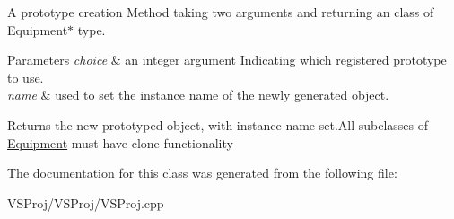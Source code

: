 A prototype creation Method taking two arguments and returning an class of Equipment$\ast$ type. 


\begin{DoxyParams}{Parameters}
{\em choice} & an integer argument Indicating which registered prototype to use. \\
\hline
{\em name} & used to set the instance name of the newly generated object. \\
\hline
\end{DoxyParams}
\begin{DoxyReturn}{Returns}
the new prototyped object, with instance name set.\+All subclasses of \hyperlink{class_equipment}{Equipment} must have clone functionality 
\end{DoxyReturn}


The documentation for this class was generated from the following file\+:\begin{DoxyCompactItemize}
\item 
V\+S\+Proj/\+V\+S\+Proj/V\+S\+Proj.\+cpp\end{DoxyCompactItemize}
